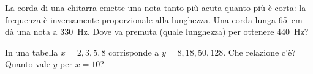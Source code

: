 \begin{esercizio}
La corda di una chitarra emette una nota tanto più acuta quanto più è corta: la frequenza è inversamente proporzionale alla lunghezza. Una corda lunga \SI{65}{\centi\metre} dà una nota a \SI{330}{\hertz}. Dove va premuta (quale lunghezza) per ottenere \SI{440}{\hertz}?\\
\end{esercizio}

\begin{esercizio}
In una tabella $x = 2,3,5,8$ corrisponde a $y = 8,18,50,128$. Che relazione c'è? Quanto vale $y$ per $x = 10$?\\
\end{esercizio}
